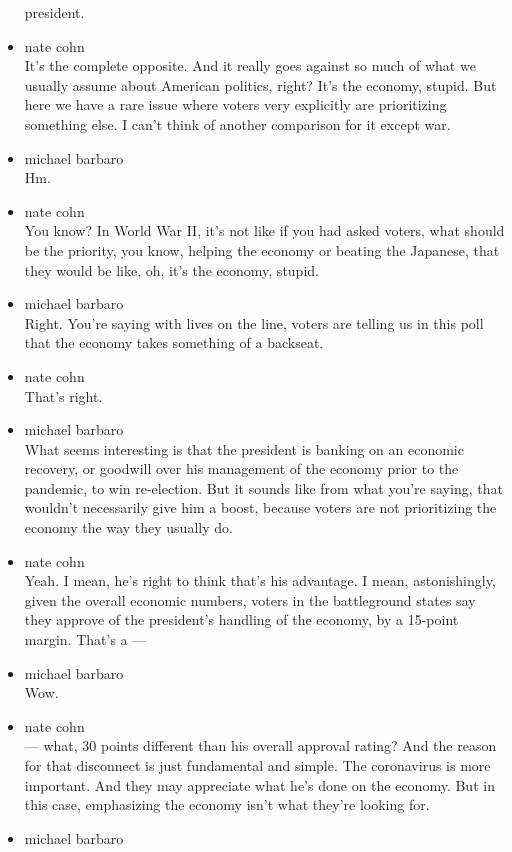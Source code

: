 \begin{itemize}
  president.
\item
  nate cohn\\
  It's the complete opposite. And it really goes against so much of what
  we usually assume about American politics, right? It's the economy,
  stupid. But here we have a rare issue where voters very explicitly are
  prioritizing something else. I can't think of another comparison for
  it except war.
\item
  michael barbaro\\
  Hm.
\item
  nate cohn\\
  You know? In World War II, it's not like if you had asked voters, what
  should be the priority, you know, helping the economy or beating the
  Japanese, that they would be like, oh, it's the economy, stupid.
\item
  michael barbaro\\
  Right. You're saying with lives on the line, voters are telling us in
  this poll that the economy takes something of a backseat.
\item
  nate cohn\\
  That's right.
\item
  michael barbaro\\
  What seems interesting is that the president is banking on an economic
  recovery, or goodwill over his management of the economy prior to the
  pandemic, to win re-election. But it sounds like from what you're
  saying, that wouldn't necessarily give him a boost, because voters are
  not prioritizing the economy the way they usually do.
\item
  nate cohn\\
  Yeah. I mean, he's right to think that's his advantage. I mean,
  astonishingly, given the overall economic numbers, voters in the
  battleground states say they approve of the president's handling of
  the economy, by a 15-point margin. That's a ---
\item
  michael barbaro\\
  Wow.
\item
  nate cohn\\
  --- what, 30 points different than his overall approval rating? And
  the reason for that disconnect is just fundamental and simple. The
  coronavirus is more important. And they may appreciate what he's done
  on the economy. But in this case, emphasizing the economy isn't what
  they're looking for.
\item
  michael barbaro\\

\end{itemize}

